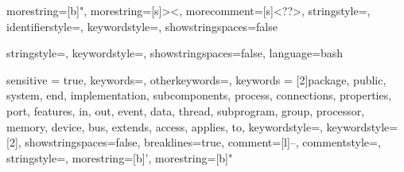 




{
    morestring=[b]",
    morestring=[s]{>}{<},
    morecomment=[s]{<?}{?>},
    stringstyle=\color{black},
    identifierstyle=\color{darkblue},
    keywordstyle=\color{cyan},
    showstringspaces=false
}


{
    stringstyle=\color{blue},
    keywordstyle=\color{blue},
    showstringspaces=false,
    language=bash
}



{
	sensitive = true,
	keywords={},
	otherkeywords={},%
  	keywords = [2]{package, public, system, end, implementation, subcomponents, process, connections, properties, port, features, in, out, event, data, thread, subprogram, group, processor, memory, device, bus, extends, access, applies, to},
  	keywordstyle=\color{blue},
  	keywordstyle=[2]\color{aadl_keywords_purple},%
  	showstringspaces=false,
  	breaklines=true,
  	comment=[l]{--},
  	commentstyle=\color{aadl_comment_green}\ttfamily,
  	stringstyle=\color{red}\ttfamily,
  	morestring=[b]',
  	morestring=[b]"
}

